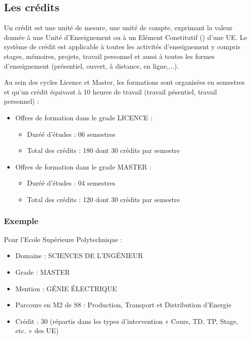 \subsection{Les crédits}
Un crédit est une unité de mesure, une unité de compte, exprimant la valeur donnée à une Unité d'Enseignement ou à un Elément Constitutif () d'une UE.
Le système de crédit est applicable à toutes les activités d'enseignement y compris stages, mémoires, projets, travail personnel et aussi à toutes les formes d'enseignement (présentiel, ouvert, à distance, en ligne,...).
\medskip

Au sein des cycles Licence et Master, les formations sont organisées en semestres et qu'un crédit équivaut à 10 heures de travail (travail pésentiel, travail personnel) :
\begin{itemize}
	\item Offres de formation dans le grade LICENCE : 
	\begin{itemize}
		\item[\textbullet] Duréé d'études : 06 semestres
		\item[\textbullet] Total des crédits : 180 dont 30 crédits par semestre
	\end{itemize}
	\item Offres de formation dans le grade MASTER : 
	\begin{itemize}
		\item[\textbullet] Duréé d'études : 04 semestres
		\item[\textbullet] Total des crédits : 120 dont 30 crédits par semestre
	\end{itemize}
\end{itemize}

\subsubsection{Exemple} Pour l'Ecole Supérieure Polytechnique : 
\begin{itemize}
	\item Domaine : SCIENCES DE L'INGÉNIEUR
	\item Grade : MASTER
	\item Mention : GÉNIE ÉLECTRIQUE
	\item Parcours en M2 de S8 : Production, Transport et Distribution d'Energie
	\item Crédit : 30 (répartis dans les types d'intervention « Cours, TD, TP, Stage, etc. » des UE)
\end{itemize}

